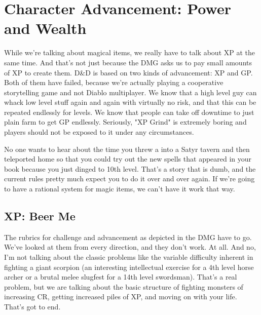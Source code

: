 \section{Character Advancement: Power and Wealth}
\vspace*{-8pt}

While we're talking about magical items, we really have to talk about XP at the same time. And that's not just because the DMG asks us to pay small amounts of XP to create them. D\&D is based on two kinds of advancement: XP and GP. Both of them have failed, because we're actually playing a cooperative storytelling game and not Diablo multiplayer. We know that a high level guy can whack low level stuff again and again with virtually no risk, and that this can be repeated endlessly for levels. We know that people can take off downtime to just plain farm to get GP endlessly. Seriously, "XP Grind" is extremely boring and players should not be exposed to it under any circumstances.

No one wants to hear about the time you threw a  into a Satyr tavern and then teleported home so that you could try out the new spells that appeared in your book because you just dinged to 10th level. That's a story that is dumb, and the current rules pretty much expect you to do it over and over again. If we're going to have a rational system for magic items, we can't have it work that way.

\subsection{XP: Beer Me}
\vspace*{-8pt}

The rubrics for challenge and advancement as depicted in the DMG have to go. We've looked at them from every direction, and they don't work. At all. And no, I'm not talking about the classic problems like the variable difficulty inherent in fighting a giant scorpion (an interesting intellectual exercise for a 4th level horse archer or a brutal melee slugfest for a 14th level swordsman). That's a real problem, but we are talking about the basic structure of fighting monsters of increasing CR, getting increased piles of XP, and moving on with your life. That's got to end.

